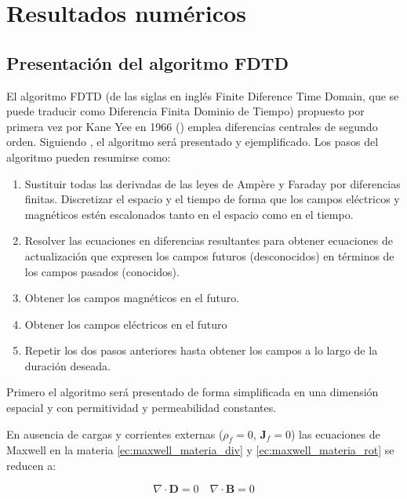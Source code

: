 \section{Resultados numéricos}

\subsection{Presentación del algoritmo FDTD}

El algoritmo FDTD (de las siglas en inglés Finite Diference Time Domain, que se puede traducir como Diferencia Finita Dominio de Tiempo) propuesto por primera vez por Kane Yee en 1966 (\cite{kane_yee_numerical_1966}) emplea diferencias centrales de segundo orden. Siguiendo \cite{taflove_computational_2010}, \cite{schneider_understanding_2025} el algoritmo será presentado y ejemplificado. Los pasos del algoritmo pueden resumirse como:

\begin{enumerate}
    \item Sustituir todas las derivadas de las leyes de Ampère y Faraday por diferencias finitas. Discretizar el espacio y el tiempo de forma que los campos eléctricos y magnéticos estén escalonados tanto en el espacio como en el tiempo.
    \item Resolver las ecuaciones en diferencias resultantes para obtener ecuaciones de actualización que expresen los campos futuros (desconocidos) en términos de los campos pasados (conocidos).
    \item Obtener los campos magnéticos en el futuro.
    \item Obtener los campos eléctricos en el futuro
    \item Repetir los dos pasos anteriores hasta obtener los campos a lo largo de la duración deseada.
\end{enumerate}

Primero el algoritmo será presentado de forma simplificada en una dimensión espacial y con permitividad y permeabilidad constantes.

En ausencia de cargas y corrientes externas ($\rho_f = 0$, $\mathbf{J}_f = 0$) las ecuaciones de Maxwell en la materia \ref{ec:maxwell_materia_div} y \ref{ec:maxwell_materia_rot} se reducen a:

\begin{equation}\label{ec:maxwell_materia_div_no_libre}
    \nabla\cdot \mathbf{D} = 0 \quad \nabla\cdot \mathbf{B} = 0 
\end{equation}

